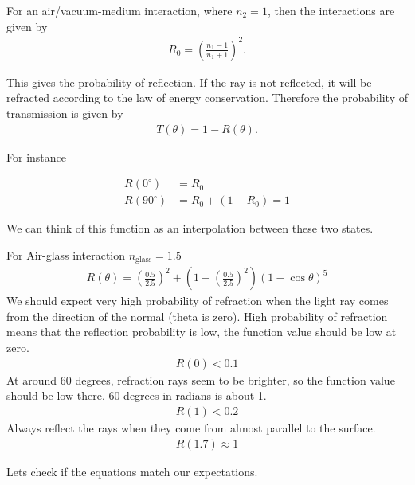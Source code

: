 \documentclass[10pt]{armath}
\numberwithin{equation}{section}
\newenvironment{Figure}
{\par\medskip\noindent\minipage{\linewidth}}
{\endminipage\par\medskip}
\theoremstyle{definition}
\begin{document}
\begin{multicols}{2}
  For an air/vacuum-medium interaction, where $n_2=1$, then the interactions are
  given by
  \begin{align*}
    R_0={\left(\frac{n_1-1}{n_1+1}\right)}^2.
  \end{align*}

  This gives the probability of reflection. If the ray is not reflected, it will
  be refracted according to the law of energy conservation. Therefore the
  probability of transmission is given by
  \begin{align*}
    T(\theta)=1-R(\theta).
  \end{align*}

  For instance

  \begin{align*}
    R\left(0^\circ\right)&=R_0\\
    R\left(90^\circ\right)&=R_0+\left(1-R_0\right)=1
  \end{align*}

  We can think of this function as an interpolation between these two states.

  For Air-glass interaction $n_\text{glass}=1.5$
  \begin{align*}
    R(\theta)={\left(\frac{0.5}{2.5}\right)}^2+\left(1-{\left(\frac{0.5}{2.5}\right)}^2\right){\left(1-\cos\theta\right)}^5
  \end{align*}
  We should expect very high probability of refraction when the light ray comes
  from the direction of the normal (theta is zero). High probability of
  refraction means that the reflection probability is low, the function value
  should be low at zero.
  \begin{align*}
    R(0)<0.1
  \end{align*}
  At around 60 degrees, refraction rays seem to be brighter, so the function
  value should be low there. 60  degrees in radians is about 1.
  \begin{align*}
    R(1)<0.2
  \end{align*}
  Always reflect the rays when they come from almost parallel to the surface.
  \begin{align*}
    R(1.7)\approx 1
  \end{align*}

  Lets check if the equations match our expectations.

  \begin{Figure}
    \begin{center}
      
    \end{center}
    \label{fig:05_2}
  \end{Figure}


\end{multicols}
\end{document}
